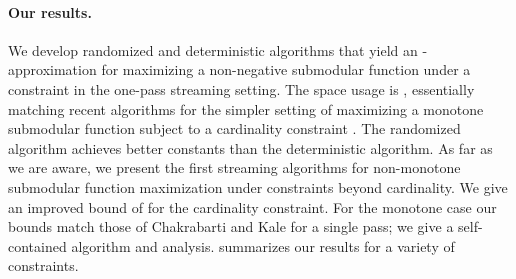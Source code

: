 \documentclass[oneside,letterpaper]{scrartcl} \usepackage{macros}
\begin{document}
\paragraph{Our results.} We develop randomized and deterministic
algorithms that yield an -approximation for maximizing a
non-negative submodular function under a 
constraint in the one-pass streaming setting. The space usage is , essentially matching recent algorithms for the simpler
setting of maximizing a monotone submodular function subject to a
cardinality constraint \cite{bmkk-sso-14}. The randomized algorithm
achieves better constants than the deterministic algorithm. As far as
we are aware, we present the first streaming algorithms for
non-monotone submodular function maximization under constraints beyond
cardinality.  We give an improved bound of  for
the cardinality constraint.  For the monotone case our bounds match
those of Chakrabarti and Kale \cite{ck-smms-14} for a single pass; we
give a self-contained algorithm and analysis. 
summarizes our results for a variety of constraints.

\iffalse
\subsection{Our Results}
We give a simple and efficient streaming algorithm for submodular
maximization subject to a \refterm{-matchoid} constraint, which
generalizes a wide class of independence constraints. Detailed
definition of the constraints are presented in
\refsection{preliminaries}.
\begin{itemize}
\item We give an -approximation for maximizing
  nonnegative submodular function subject to
  \refterm{-matchoid}s. The algorithm makes a single pass over the
  datastream and uses  memory where 
  is an upper bound on the rank of the
  \refterm{-matchoid}. \refterm{-matchoid}s generalizes
  intersection of -matroids, and -matching in hypergraph of rank
  . Thus the result extends to these special cases as well. In
  particular for a single matroid we get -approximation in a single pass. Refer
  \refsection{nonnegative-matchoid}.

\item As a corollary of the technique developed in this paper we get a
   approximation in the monotone case, which matches the existing
  result of Chakrabarti and Kale \cite{ck-smms-14}, and is
  conceptually much simpler.

\end{itemize}
\fi
\end{document}
